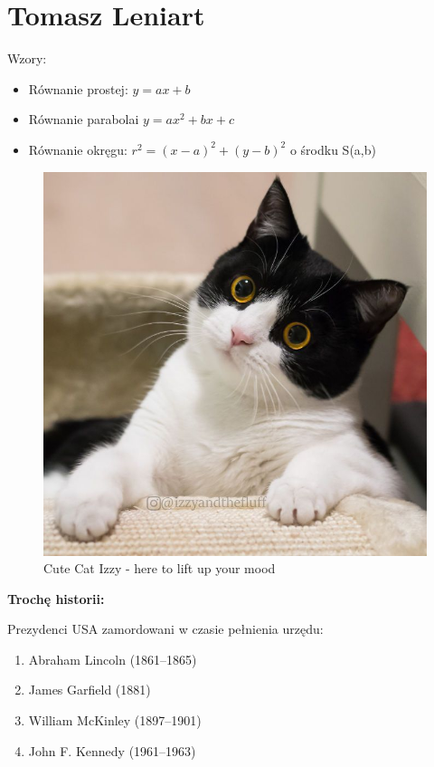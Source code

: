 \newpage
\section{Tomasz Leniart}

Wzory:
\begin{itemize}
    \item Równanie prostej: $ y = ax + b $
    \item Równanie parabolai $ y = ax^2 + bx + c $
    \item Równanie okręgu: $ r^2 = (x - a)^2 + (y - b)^2 $ o środku S(a,b)
\end{itemize}



\begin{figure}[htbp]
    \centering
    \includegraphics[scale=1.2]{pictures/image_TLeniart.jpg}
    \caption{Cute Cat Izzy - here to lift up your mood}
    \label{fig:cat}
\end{figure}

{\Large{\bf Trochę historii:}\newline}

Prezydenci USA zamordowani w czasie pełnienia urzędu:
\begin{enumerate}
    \item Abraham Lincoln (1861–1865)
    \item James Garfield (1881)
    \item William McKinley (1897–1901)
    \item John F. Kennedy (1961–1963)
\end{enumerate}

